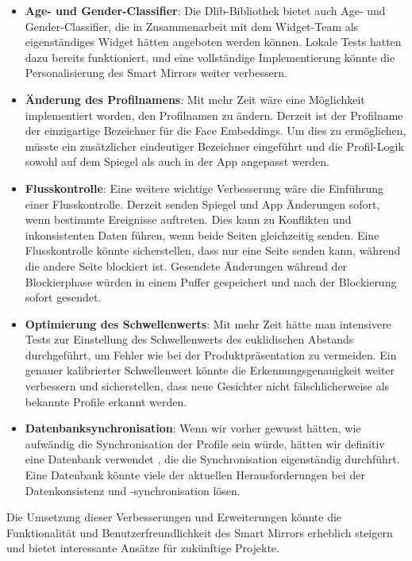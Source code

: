 \begin{itemize}
    \item \textbf{Age- und Gender-Classifier}: Die Dlib-Bibliothek bietet auch Age- und Gender-Classifier, die in Zusammenarbeit mit dem Widget-Team als eigenständiges Widget hätten angeboten werden können. Lokale Tests hatten dazu bereits funktioniert, und eine vollständige Implementierung könnte die Personalisierung des Smart Mirrors weiter verbessern.
    
    \item \textbf{Änderung des Profilnamens}: Mit mehr Zeit wäre eine Möglichkeit implementiert worden, den Profilnamen zu ändern. Derzeit ist der Profilname der einzigartige Bezeichner für die Face Embeddings. Um dies zu ermöglichen, müsste ein zusätzlicher eindeutiger Bezeichner eingeführt und die Profil-Logik sowohl auf dem Spiegel als auch in der App angepasst werden.
    
    \item \textbf{Flusskontrolle}: Eine weitere wichtige Verbesserung wäre die Einführung einer Flusskontrolle. Derzeit senden Spiegel und App Änderungen sofort, wenn bestimmte Ereignisse auftreten. Dies kann zu Konflikten und inkonsistenten Daten führen, wenn beide Seiten gleichzeitig senden. Eine Flusskontrolle könnte sicherstellen, dass nur eine Seite senden kann, während die andere Seite blockiert ist. Gesendete Änderungen während der Blockierphase würden in einem Puffer gespeichert und nach der Blockierung sofort gesendet.
    
    \item \textbf{Optimierung des Schwellenwerts}: Mit mehr Zeit hätte man intensivere Tests zur Einstellung des Schwellenwerts des euklidischen Abstands durchgeführt, um Fehler wie bei der Produktpräsentation zu vermeiden. Ein genauer kalibrierter Schwellenwert könnte die Erkennungsgenauigkeit weiter verbessern und sicherstellen, dass neue Gesichter nicht fälschlicherweise als bekannte Profile erkannt werden.
    
    \item \textbf{Datenbanksynchronisation}: Wenn wir vorher gewusst hätten, wie aufwändig die Synchronisation der Profile sein würde, hätten wir definitiv eine Datenbank verwendet , die die Synchronisation eigenständig durchführt. Eine Datenbank könnte viele der aktuellen Herausforderungen bei der Datenkonsistenz und -synchronisation lösen.
\end{itemize}

Die Umsetzung dieser Verbesserungen und Erweiterungen könnte die Funktionalität und Benutzerfreundlichkeit des Smart Mirrors erheblich steigern und bietet interessante Ansätze für zukünftige Projekte.
